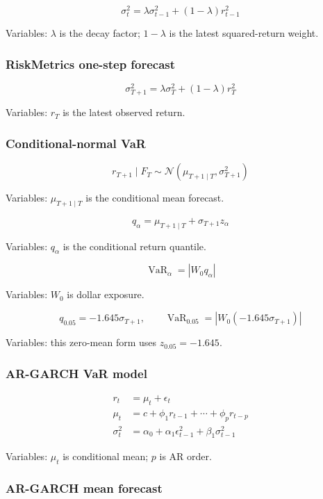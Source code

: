 \documentclass[
  8pt,
  twocolumn]{extarticle}
\begin{document}
\[
\sigma_t^2=\lambda\sigma_{t-1}^2+(1-\lambda)r_{t-1}^2
\]

Variables: \(\lambda\) is the decay factor; \(1-\lambda\) is the latest
squared-return weight.

\subsubsection{RiskMetrics one-step
forecast}\label{riskmetrics-one-step-forecast}

\[
\sigma_{T+1}^2=\lambda\sigma_T^2+(1-\lambda)r_T^2
\]

Variables: \(r_T\) is the latest observed return.

\subsubsection{Conditional-normal VaR}\label{conditional-normal-var}

\[
r_{T+1}\mid F_T\sim\mathcal N(\mu_{T+1\mid T},\sigma_{T+1}^2)
\]

Variables: \(\mu_{T+1\mid T}\) is the conditional mean forecast.

\[
q_\alpha=\mu_{T+1\mid T}+\sigma_{T+1}z_\alpha
\]

Variables: \(q_\alpha\) is the conditional return quantile.

\[
\operatorname{VaR}_\alpha=|W_0q_\alpha|
\]

Variables: \(W_0\) is dollar exposure.

\[
q_{0.05}=-1.645\sigma_{T+1},\qquad \operatorname{VaR}_{0.05}=|W_0(-1.645\sigma_{T+1})|
\]

Variables: this zero-mean form uses \(z_{0.05}=-1.645\).

\subsubsection{AR-GARCH VaR model}\label{ar-garch-var-model}

\[
\begin{aligned}
r_t&=\mu_t+\epsilon_t\\
\mu_t&=c+\phi_1r_{t-1}+\cdots+\phi_pr_{t-p}\\
\sigma_t^2&=\alpha_0+\alpha_1\epsilon_{t-1}^2+\beta_1\sigma_{t-1}^2
\end{aligned}
\]

Variables: \(\mu_t\) is conditional mean; \(p\) is AR order.

\subsubsection{AR-GARCH mean forecast}\label{ar-garch-mean-forecast}
\end{document}
